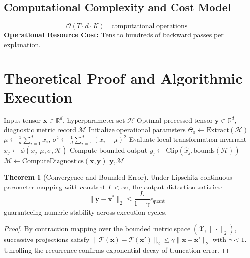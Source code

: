 \documentclass[11pt,a4paper]{article}
\theoremstyle{definition}
\newtheorem{theorem}{\textbf{Theorem}}[section]
\begin{document}
\subsection{Computational Complexity and Cost Model}
\begin{equation}
\mathcal{O}(T \cdot d \cdot K) \quad \text{computational operations}
\end{equation}
\textbf{Operational Resource Cost:} Tens to hundreds of backward passes per explanation.

\section{Theoretical Proof and Algorithmic Execution}

\begin{algorithm}[H]
\caption{Integrated gradients and gradient saliency Operational Pipeline}
\begin{algorithmic}[1]
\Require Input tensor $\mathbf{x} \in \mathbb{R}^d$, hyperparameter set $\mathcal{H}$
\Ensure Optimal processed tensor $\mathbf{y} \in \mathbb{R}^d$, diagnostic metric record $\mathcal{M}$
\State Initialize operational parameters $\Theta_0 \leftarrow \text{Extract}(\mathcal{H})$
\State $\mu \leftarrow \frac{1}{d} \sum_{i=1}^d x_i$, \quad $\sigma^2 \leftarrow \frac{1}{d} \sum_{i=1}^d (x_i - \mu)^2$
    \State Evaluate local transformation invariant $\hat{x}_j \leftarrow \phi(x_j, \mu, \sigma, \mathcal{H})$
    \State Compute bounded output $y_j \leftarrow \text{Clip}(\hat{x}_j, \text{bounds}(\mathcal{H}))$
\EndFor
\State $\mathcal{M} \leftarrow \text{ComputeDiagnostics}(\mathbf{x}, \mathbf{y})$
\State \Return $\mathbf{y}, \mathcal{M}$
\end{algorithmic}
\end{algorithm}

\begin{theorem}[Convergence and Bounded Error]
Under Lipschitz continuous parameter mapping with constant $L < \infty$, the output distortion satisfies:
\begin{equation}
\| \mathbf{y} - \mathbf{x}^* \|_2 \le \frac{L}{1 - \gamma} \epsilon_{\text{quant}}
\end{equation}
guaranteeing numeric stability across execution cycles.
\end{theorem}

\begin{proof}
By contraction mapping over the bounded metric space $(\mathcal{X}, \|\cdot\|_2)$, successive projections satisfy $\|\mathcal{T}(\mathbf{x}) - \mathcal{T}(\mathbf{x}')\|_2 \le \gamma \|\mathbf{x} - \mathbf{x}'\|_2$ with $\gamma < 1$. Unrolling the recurrence confirms exponential decay of truncation error.
\end{proof}
\end{document}
